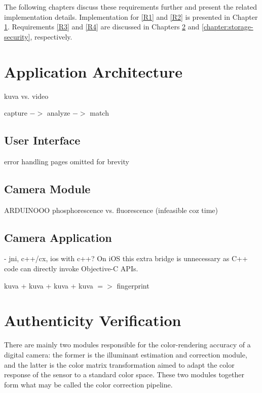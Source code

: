 \documentclass[thesis.tex]{subfiles}
\begin{document}
\noindent The following chapters discuss these requirements further and present the related implementation details. Implementation for \ref{R1} and \ref{R2} is presented in Chapter \ref{chapter:application-architecture}. Requirements \ref{R3} and \ref{R4} are discussed in Chapters \ref{chapter:authenticity-verification} and \ref{chapter:storage-security}, respectively.

\section{Application Architecture}
\label{chapter:application-architecture}

kuva vs. video

capture $->$ analyze $->$ match

\subsection{User Interface}
error handling pages omitted for brevity

\subsection{Camera Module}
ARDUINOOO
phosphorescence vs. fluorescence (infeasible coz time)

\subsection{Camera Application}
- jni, c++/cx, ios with c++?
On iOS this extra bridge is unnecessary as C++ code can directly invoke Objective-C APIs.

kuva + kuva + kuva + kuva $=>$ fingerprint

\section{Authenticity Verification}
\label{chapter:authenticity-verification}

\begin{comment}
\subsection{Color calibration}
\end{comment}
There are mainly two modules responsible for the color-rendering accuracy of a digital camera: the former is the illuminant estimation and correction module, and the latter is the color matrix transformation aimed to adapt the color response of the sensor to a standard color space. These two modules together form what may be called the color correction pipeline.
\end{document}
